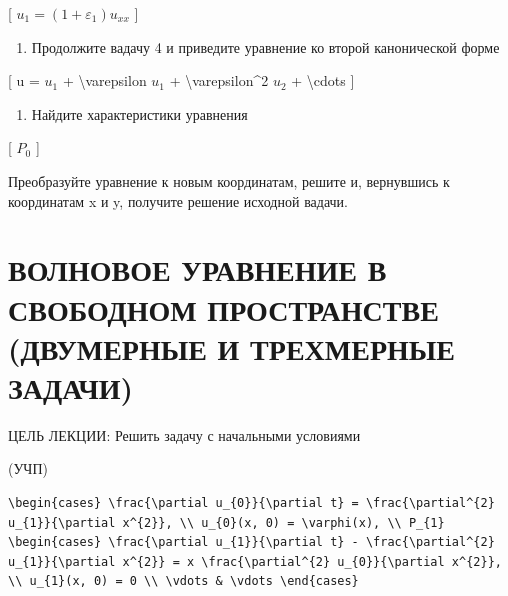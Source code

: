 \documentclass[
]{article}
\providecommand{\tightlist}{%
  \setlength{\itemsep}{0pt}\setlength{\parskip}{0pt}}
\begin{document}
{{{[} \(u_1 = (1 + \varepsilon_1) u_{xx}\) {]}

\begin{enumerate}
\def\labelenumi{\arabic{enumi}.}
\setcounter{enumi}{4}
\tightlist
\item
  Продолжите вадачу 4 и приведите уравнение ко второй канонической форме
\end{enumerate}

{[} u = \(u_1\) + \textbackslash varepsilon \(u_1\) +
\textbackslash varepsilon\^{}2 \(u_2\) + \textbackslash cdots {]}

\begin{enumerate}
\def\labelenumi{\arabic{enumi}.}
\setcounter{enumi}{5}
\tightlist
\item
  Найдите характеристики уравнения
\end{enumerate}

{[} \(P_{0}\) {]}

Преобразуйте уравнение к новым координатам, решите и, вернувшись к
координатам x и y, получите решение исходной вадачи.

\section{ВОЛНОВОЕ УРАВНЕНИЕ В СВОБОДНОМ ПРОСТРАНСТВЕ (ДВУМЕРНЫЕ И
ТРЕХМЕРНЫЕ
ЗАДАЧИ)}\label{ux432ux43eux43bux43dux43eux432ux43eux435-ux443ux440ux430ux432ux43dux435ux43dux438ux435-ux432-ux441ux432ux43eux431ux43eux434ux43dux43eux43c-ux43fux440ux43eux441ux442ux440ux430ux43dux441ux442ux432ux435-ux434ux432ux443ux43cux435ux440ux43dux44bux435-ux438-ux442ux440ux435ux445ux43cux435ux440ux43dux44bux435-ux437ux430ux434ux430ux447ux438}

ЦЕЛЬ ЛЕКЦИИ: Решить задачу с начальными условиями

(УЧП)

\begin{verbatim}
\begin{cases} \frac{\partial u_{0}}{\partial t} = \frac{\partial^{2} u_{1}}{\partial x^{2}}, \\ u_{0}(x, 0) = \varphi(x), \\ P_{1} \begin{cases} \frac{\partial u_{1}}{\partial t} - \frac{\partial^{2} u_{1}}{\partial x^{2}} = x \frac{\partial^{2} u_{0}}{\partial x^{2}}, \\ u_{1}(x, 0) = 0 \\ \vdots & \vdots \end{cases}
\end{verbatim}

}}
\end{document}
